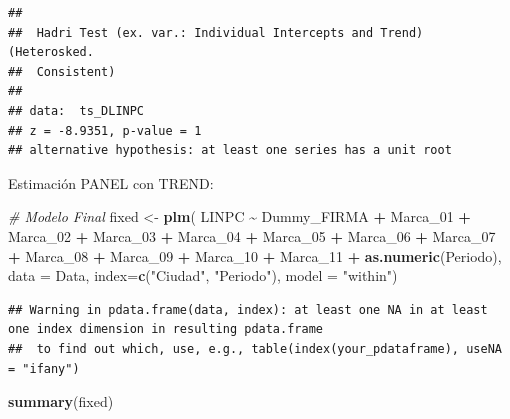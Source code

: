 \documentclass[
]{book}
\newenvironment{Shaded}{\begin{snugshade}}{\end{snugshade}}
\newcommand{\AttributeTok}[1]{\textcolor[rgb]{0.13,0.29,0.53}{#1}}
\newcommand{\CommentTok}[1]{\textcolor[rgb]{0.56,0.35,0.01}{\textit{#1}}}
\newcommand{\FunctionTok}[1]{\textcolor[rgb]{0.13,0.29,0.53}{\textbf{#1}}}
\newcommand{\NormalTok}[1]{#1}
\newcommand{\OtherTok}[1]{\textcolor[rgb]{0.56,0.35,0.01}{#1}}
\newcommand{\SpecialCharTok}[1]{\textcolor[rgb]{0.81,0.36,0.00}{\textbf{#1}}}
\newcommand{\StringTok}[1]{\textcolor[rgb]{0.31,0.60,0.02}{#1}}
\begin{document}
\begin{verbatim}
## 
##  Hadri Test (ex. var.: Individual Intercepts and Trend) (Heterosked.
##  Consistent)
## 
## data:  ts_DLINPC
## z = -8.9351, p-value = 1
## alternative hypothesis: at least one series has a unit root
\end{verbatim}

Estimación PANEL con TREND:

\begin{Shaded}
\begin{Highlighting}[]
\CommentTok{\# Modelo Final}
\NormalTok{fixed }\OtherTok{\textless{}{-}} \FunctionTok{plm}\NormalTok{( LINPC }\SpecialCharTok{\textasciitilde{}}\NormalTok{ Dummy\_FIRMA }\SpecialCharTok{+}\NormalTok{ Marca\_01 }\SpecialCharTok{+}\NormalTok{ Marca\_02 }\SpecialCharTok{+}\NormalTok{ Marca\_03 }\SpecialCharTok{+}\NormalTok{ Marca\_04 }\SpecialCharTok{+}\NormalTok{ Marca\_05 }\SpecialCharTok{+} 
\NormalTok{              Marca\_06 }\SpecialCharTok{+}\NormalTok{ Marca\_07 }\SpecialCharTok{+}\NormalTok{ Marca\_08 }\SpecialCharTok{+}\NormalTok{ Marca\_09 }\SpecialCharTok{+}\NormalTok{ Marca\_10 }\SpecialCharTok{+}\NormalTok{ Marca\_11 }\SpecialCharTok{+} \FunctionTok{as.numeric}\NormalTok{(Periodo),}
             \AttributeTok{data =}\NormalTok{ Data, }
             \AttributeTok{index=}\FunctionTok{c}\NormalTok{(}\StringTok{"Ciudad"}\NormalTok{, }\StringTok{"Periodo"}\NormalTok{), }
             \AttributeTok{model =} \StringTok{"within"}\NormalTok{)}
\end{Highlighting}
\end{Shaded}

\begin{verbatim}
## Warning in pdata.frame(data, index): at least one NA in at least one index dimension in resulting pdata.frame
##  to find out which, use, e.g., table(index(your_pdataframe), useNA = "ifany")
\end{verbatim}

\begin{Shaded}
\begin{Highlighting}[]
\FunctionTok{summary}\NormalTok{(fixed)}
\end{Highlighting}
\end{Shaded}
\end{document}
